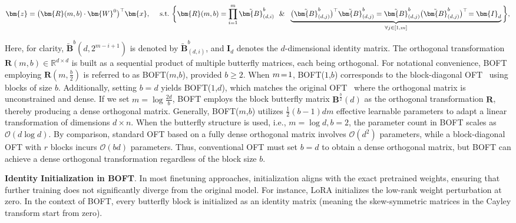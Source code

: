 \begin{equation}
    \begin{aligned}\nonumber
    \bm{z}=\big(\bm{R}(m,b)\cdot\bm{W}^0\big)^\top\bm{x},~~~~\text{s.t.}~\bigg{\{}\bm{R}(m,b)=\prod_{i=1}^m \tilde{\bm{B}}^b_{(d,i)}~~\&~~\underbrace{\big(\tilde{\bm{B}}^b_{(d,j)}\big)^\top\tilde{\bm{B}}^b_{(d,j)}=\tilde{\bm{B}}^b_{(d,j)}\big(\tilde{\bm{B}}^b_{(d,j)}\big)^\top\!=\bm{I}_d}_{\forall j\in [1, m]}\bigg{\}},
    \end{aligned}
\end{equation}

Here, for clarity, $\tilde{\bm{B}}^b(d,2^{m - i+1})$ is denoted by $\tilde{\bm{B}}^b_{(d,i)}$, and $\bm{I}_d$ denotes the $d$-dimensional identity matrix. The orthogonal transformation $\bm{R}(m,b)\in\mathbb{R}^{d\times d}$ is built as a sequential product of multiple butterfly matrices, each being orthogonal. For notational convenience, BOFT employing $\bm{R}(m,\frac{b}{2})$ is referred to as BOFT($m$,$b$), provided $b\geq 2$. When $\thickmuskip=2mu \medmuskip=2mu m=1$, BOFT($1$,$b$) corresponds to the block-diagonal OFT~\cite{qiu2023controlling} using blocks of size $b$. Additionally, setting $b=d$ yields BOFT($1$,$d$), which matches the original OFT~\cite{qiu2023controlling} where the orthogonal matrix is unconstrained and dense. If we set $m=\log \frac{2d}{b}$, BOFT employs the block butterfly matrix $\bm{B}^{\frac{b}{2}}(d)$ as the orthogonal transformation $\bm{R}$, thereby producing a dense orthogonal matrix. Generally, BOFT($m$,$b$) utilizes $\frac{1}{2}(b-1)dm$ effective learnable parameters to adapt a linear transformation of dimensions $d\times n$. When the butterfly structure is used, i.e., $m=\log d,b=2$, the parameter count in BOFT scales as $\mathcal{O}(d\log d)$. By comparison, standard OFT based on a fully dense orthogonal matrix involves $\mathcal{O}(d^2)$ parameters, while a block-diagonal OFT with $r$ blocks incurs $\mathcal{O}(bd)$ parameters. Thus, conventional OFT must set $b=d$ to obtain a dense orthogonal matrix, but BOFT can achieve a dense orthogonal transformation regardless of the block size $b$.

\textbf{Identity Initialization in BOFT}. In most finetuning approaches, initialization aligns with the exact pretrained weights, ensuring that further training does not significantly diverge from the original model. For instance, LoRA initializes the low-rank weight perturbation at zero. In the context of BOFT, every butterfly block is initialized as an identity matrix (meaning the skew-symmetric matrices in the Cayley transform start from zero).

